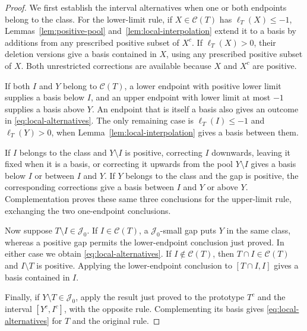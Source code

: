 \begin{proof}
We first establish the interval alternatives when one or both endpoints
belong to the class. For the lower-limit rule, if
$X\in\mathcal C(T)$ has $\ell_T(X)\le-1$,
Lemmas~\ref{lem:positive-pool} and~\ref{lem:local-interpolation}
extend it to a basis by additions from any prescribed positive
subset of $X^c$. If $\ell_T(X)>0$, their deletion versions give a
basis contained in $X$, using any prescribed positive subset of $X$.
Both unrestricted corrections are available because $X$ and $X^c$
are positive.

If both $I$ and $Y$ belong to $\mathcal C(T)$, a lower endpoint with
positive lower limit supplies a basis below $I$, and an upper
endpoint with lower limit at most $-1$ supplies a basis above $Y$.
An endpoint that is itself a basis also gives an outcome in
\eqref{eq:local-alternatives}. The only remaining case is
$\ell_T(I)\le-1$ and $\ell_T(Y)>0$, when
Lemma~\ref{lem:local-interpolation} gives a basis between them.

If $I$ belongs to the class and $Y\setminus I$ is positive,
correcting $I$ downwards, leaving it fixed when it is a basis, or
correcting it upwards from the pool $Y\setminus I$ gives a basis
below $I$ or between $I$ and $Y$.
If $Y$ belongs to the class and the gap is positive, the
corresponding corrections give a basis between $I$ and $Y$ or
above $Y$.
Complementation proves these same three conclusions for the
upper-limit rule, exchanging the two one-endpoint conclusions.

Now suppose $T\setminus I\in\mathcal J_0$.
If $I\in\mathcal C(T)$, a $\mathcal J_0$-small gap puts $Y$ in the same class,
whereas a positive gap permits the lower-endpoint conclusion just
proved. In either case we obtain \eqref{eq:local-alternatives}.
If $I\notin\mathcal C(T)$, then $T\cap I\in\mathcal C(T)$ and
$I\setminus T$ is positive. Applying the lower-endpoint conclusion
to $[T\cap I,I]$ gives a basis contained in $I$.

Finally, if $Y\setminus T\in\mathcal J_0$, apply the result just
proved to the prototype $T^c$ and the interval $[Y^c,I^c]$, with
the opposite rule. Complementing its basis gives
\eqref{eq:local-alternatives} for $T$ and the original rule.
\end{proof}
